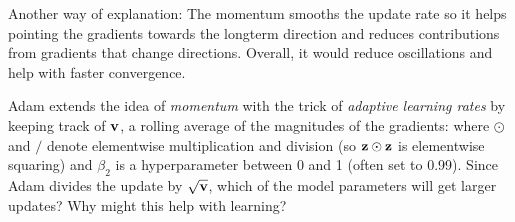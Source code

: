 \begin{parts}
\begin{subparts}
{                Another way of explanation: The momentum smooths the update rate so it helps pointing the gradients towards the longterm direction and reduces contributions from gradients that change directions. Overall, it would reduce oscillations and help with faster convergence.} \newline
                
            \subpart[2] Adam extends the idea of {\it momentum} with the trick of {\it adaptive learning rates} by keeping track of  $\mathbf{v}$, a rolling average of the magnitudes of the gradients:
                where $\odot$ and $/$ denote elementwise multiplication and division (so $\mathbf{z} \odot \mathbf{z}$ is elementwise squaring) and $\beta_2$ is a hyperparameter between 0 and 1 (often set to  0.99). Since Adam divides the update by $\sqrt{\mathbf{v}}$, which of the model parameters will get larger updates?  Why might this help with learning? \newline
                
                 \newline
                
                \end{subparts}
        
        

\end{parts}
